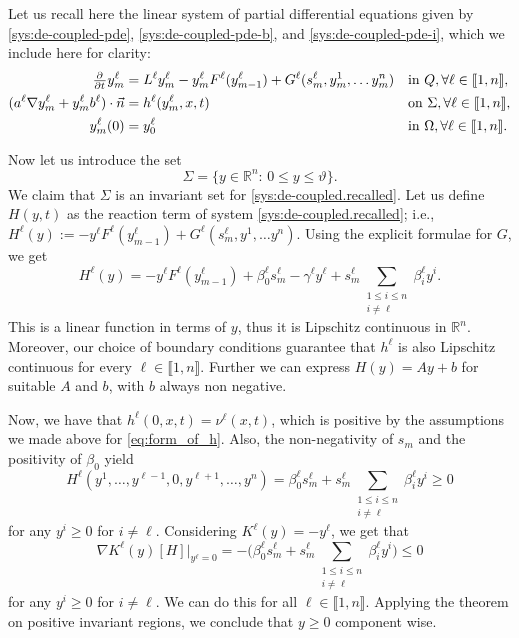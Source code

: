 \documentclass[11pt]{article}
\newcommand{\R}{\mathbb{R}}
\newcommand{\llb}{\llbracket}
\newcommand{\rrb}{\rrbracket}
\numberwithin{equation}{section}
\begin{document}
Let us recall here the linear system of partial differential equations given by \eqref{sys:de-coupled-pde}, \eqref{sys:de-coupled-pde-b}, and \eqref{sys:de-coupled-pde-i}, which we include here for clarity:
\begin{subequations}
\label{sys:de-coupled.recalled}
\begin{align}
	\pd{ }{t} y_m^\ell &= L^\ell y_m^\ell - y^\ell_m F^\ell(y_{m-1}^\ell) + G^\ell(s_m^\ell,y_{m}^1,\ldots y_{m}^n) 		&& \text{in } Q, \forall \ell \in \llb 1,n\rrb,
	\label{sys:de-coupled-pde.recalled}
	\\
	 (a^\ell  \nabla y_m^\ell + y_m^\ell b^\ell) \cdot \vec{n} &= h^\ell (y_{m}^\ell,x, t)	&& \text{on } \Sigma,\forall \ell \in \llb 1,n\rrb,
	 \label{sys:de-coupled-pde-b.recalled}
	 \\
	 y_m^\ell(0) &= y^\ell_{0}			 && \text{in } \Omega, \forall \ell \in \llb 1,n\rrb.
	 \label{sys:de-coupled-pde-i.recalled}
\end{align}
\end{subequations}

Now let us introduce the set 
\[
	\Sigma  = \big\{ y \in \R^n :\, 0 \leq y \leq \vartheta  \big\}.
\]
We claim that \(\Sigma\) is an invariant set for \eqref{sys:de-coupled.recalled}. 
Let us define \(H(y,t)\) as the reaction term of system \eqref{sys:de-coupled.recalled}; i.e., \( H^\ell (y) := - y^\ell F^\ell(y_{m-1}^\ell) + G^\ell(s_m^\ell, y^1,\ldots y^n) \). Using the explicit formulae for \(G\), we get
\[
	H^\ell (y) = -y^\ell F^\ell(y_{m-1}^\ell) + \beta_0^\ell s_m^\ell - \gamma^\ell y^\ell + s_m^\ell \sum_{\substack{1\le i\le n\\ i\neq \ell}} \beta_i^\ell y^i.
\]
This is a linear function in terms of \(y\), thus it is Lipschitz continuous in \(\R^n\). Moreover, our choice of boundary conditions guarantee that \(h^\ell\) is also Lipschitz continuous for every \(\ell \in \llb 1, n\rrb\). Further we can express \(H (y) = Ay + b\) for suitable \(A\) and \(b\), with \(b\) always non negative.

Now, we have that \( h^\ell (0,x, t) = \nu^\ell (x,t) \), which is positive by the assumptions we made above for \eqref{eq:form_of_h}. Also, the non-negativity of \(s_m\) and the positivity of \(\beta_0\) yield
\begin{equation}
\label{ev:at_zero_for_ell}
	H^\ell( y^1, \ldots, y^{\ell-1}, 0, y^{\ell+1}, \ldots, y^n ) = 
	\beta_0^\ell s_m^\ell + s_m^\ell \sum_{\substack{1\le i\le n\\ i\neq \ell}}   \beta_i^\ell  y^i \geq 0
\end{equation}
for any \(y^i\geq 0\) for \(i\neq \ell\).
Considering \(K^\ell(y) = -y^\ell\), we get that 
\[
	\nabla K^\ell(y)[H] \big|_{y^\ell = 0} = - \big( \beta_0^\ell s_m^\ell + s_m^\ell \sum_{\substack{1\le i\le n\\ i\neq \ell}}   \beta_i^\ell  y^i \big) \leq 0
\]
for any \(y^i\geq 0\) for \(i\neq \ell\). We can do this for all \(\ell \in \llb 1,n\rrb\). 
Applying the theorem on positive invariant regions, we conclude that \( y\geq 0\) component wise. 
\end{document}
